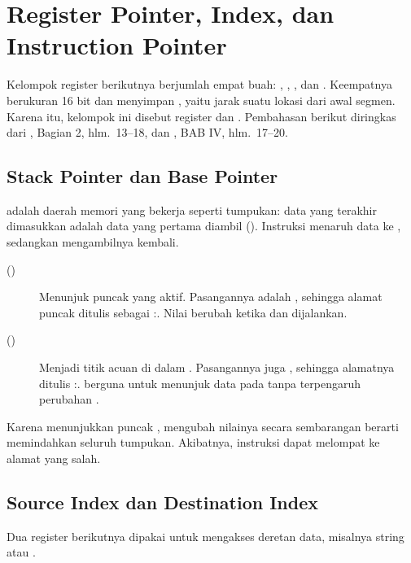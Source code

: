 \section{Register Pointer, Index, dan Instruction Pointer}
\label{sec:register-pointer}

Kelompok register berikutnya berjumlah empat buah: , ,
, dan . Keempatnya berukuran 16 bit dan menyimpan
, yaitu jarak suatu lokasi dari awal segmen. Karena itu,
kelompok ini disebut register  dan .
Pembahasan berikut diringkas dari \cite{gunawan2019}, Bagian 2,
hlm.~13--18, dan \cite{sto2001}, BAB IV, hlm.~17--20.

\subsection{Stack Pointer dan Base Pointer}

 adalah daerah memori yang bekerja seperti tumpukan:
data yang terakhir dimasukkan adalah data yang pertama diambil
(). Instruksi  menaruh data ke
, sedangkan  mengambilnya kembali.

\begin{description}
    \item[ ()] Menunjuk puncak
           yang aktif. Pasangannya adalah ,
          sehingga alamat puncak  ditulis sebagai
          :. Nilai  berubah ketika
           dan  dijalankan.

    \item[ ()] Menjadi titik acuan di
          dalam . Pasangannya juga , sehingga
          alamatnya ditulis :.  berguna
          untuk menunjuk data pada  tanpa terpengaruh
          perubahan .
\end{description}

Karena  menunjukkan puncak , mengubah nilainya
secara sembarangan berarti memindahkan seluruh tumpukan. Akibatnya,
instruksi  dapat melompat ke alamat yang salah.

\subsection{Source Index dan Destination Index}

Dua register berikutnya dipakai untuk mengakses deretan data,
misalnya string atau .

